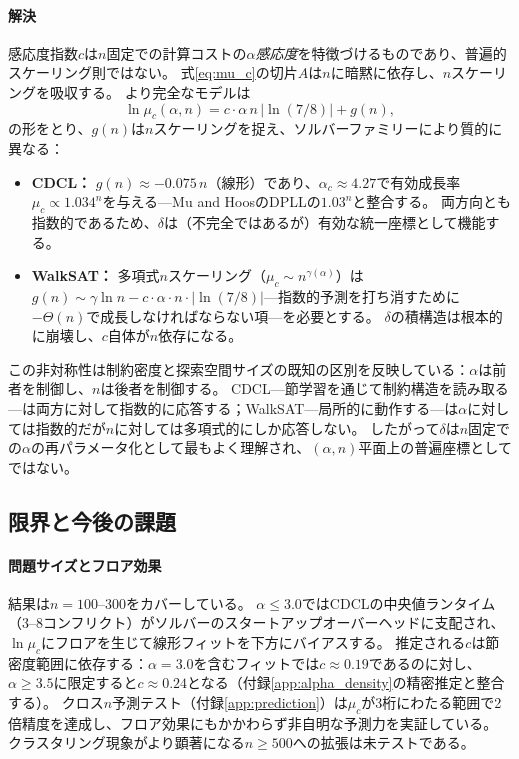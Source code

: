 \documentclass[11pt,a4paper]{article}
\newcommand{\mc}{\mu_c}
\begin{document}
\paragraph{解決}
感応度指数$c$は$n$固定での計算コストの\emph{$\alpha$感応度}を特徴づけるものであり、普遍的スケーリング則ではない。
式\eqref{eq:mu_c}の切片$A$は$n$に暗黙に依存し、$n$スケーリングを吸収する。
より完全なモデルは
\[
\ln \mc(\alpha, n) = c \cdot \alpha \, n \, |\!\ln(7/8)| + g(n),
\]
の形をとり、$g(n)$は$n$スケーリングを捉え、ソルバーファミリーにより質的に異なる：
\begin{itemize}
\item \textbf{CDCL：} $g(n) \approx -0.075\,n$（線形）であり、$\alpha_c \approx 4.27$で有効成長率$\mc \propto 1.034^n$を与える---Mu and HoosのDPLLの$1.03^n$と整合する。
  両方向とも指数的であるため、$\delta$は（不完全ではあるが）有効な統一座標として機能する。
\item \textbf{WalkSAT：} 多項式$n$スケーリング（$\mc \sim n^{\gamma(\alpha)}$）は$g(n) \sim \gamma \ln n - c \cdot \alpha \cdot n \cdot |\!\ln(7/8)|$---指数的予測を打ち消すために$-\Theta(n)$で成長しなければならない項---を必要とする。
  $\delta$の積構造は根本的に崩壊し、$c$自体が$n$依存になる。
\end{itemize}

この非対称性は制約密度と探索空間サイズの既知の区別を反映している：$\alpha$は前者を制御し、$n$は後者を制御する。
CDCL---節学習を通じて制約構造を読み取る---は両方に対して指数的に応答する；WalkSAT---局所的に動作する---は$\alpha$に対しては指数的だが$n$に対しては多項式的にしか応答しない。
したがって$\delta$は$n$固定での$\alpha$の再パラメータ化として最もよく理解され、$(\alpha, n)$平面上の普遍座標としてではない。

\subsection{限界と今後の課題}

\paragraph{問題サイズとフロア効果}
結果は$n = 100$--$300$をカバーしている。
$\alpha \leq 3.0$ではCDCLの中央値ランタイム（3--8コンフリクト）がソルバーのスタートアップオーバーヘッドに支配され、$\ln \mc$にフロアを生じて線形フィットを下方にバイアスする。
推定される$c$は節密度範囲に依存する：$\alpha = 3.0$を含むフィットでは$c \approx 0.19$であるのに対し、$\alpha \geq 3.5$に限定すると$c \approx 0.24$となる（付録\ref{app:alpha_density}の精密推定と整合する）。
クロス$n$予測テスト（付録\ref{app:prediction}）は$\mc$が3桁にわたる範囲で2倍精度を達成し、フロア効果にもかかわらず非自明な予測力を実証している。
クラスタリング現象がより顕著になる$n \geq 500$\cite{Achlioptas2008}への拡張は未テストである。
\end{document}
